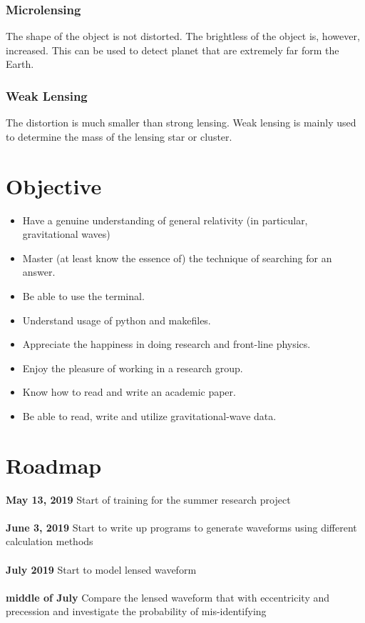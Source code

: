 \documentclass[10pt,a4paper]{article}
\begin{document}
\subsubsection{Microlensing}
The shape of the object is not distorted. The brightless of the object is, however, increased. This can be used to detect planet that are extremely far form the Earth.
\subsubsection{Weak Lensing}
The distortion is much smaller than strong lensing. Weak lensing is mainly used to determine the mass of the lensing star or cluster.
\section{Objective}
\begin{itemize}
\item Have a genuine understanding of general relativity (in particular, gravitational waves)
\item Master (at least know the essence of) the technique of searching for an answer.
\item Be able to use the terminal.
\item Understand usage of python and makefiles.
\item Appreciate the happiness in doing research and front-line physics.
\item Enjoy the pleasure of working in a research group.
\item Know how to read and write an academic paper.
\item Be able to read, write and utilize gravitational-wave data.
\end{itemize}
\section{Roadmap}
{\bf May 13, 2019} Start of training for the summer research project\\ \\
{\bf June 3, 2019} Start to write up programs to generate waveforms using different calculation methods\\ \\
{\bf July 2019} Start to model lensed waveform\\ \\
{\bf middle of July} Compare the lensed waveform that with eccentricity and precession and investigate the probability of mis-identifying
\end{document}

